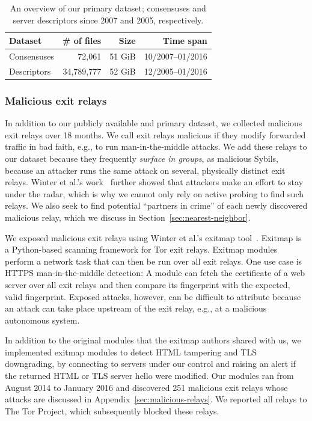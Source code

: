 \begin{table}[t]
\small
\centering
\begin{tabular}{l r r r}
\toprule
\textbf{Dataset} & \textbf{\# of files} & \textbf{Size} & \textbf{Time span} \\
\midrule
Consensuses & 72,061 & 51 GiB & 10/2007--01/2016 \\
Descriptors & 34,789,777 & 52 GiB & 12/2005--01/2016 \\
\bottomrule
\end{tabular}
\caption{An overview of our primary dataset; consensuses and server descriptors
since 2007 and 2005, respectively.}
\label{tab:collector-dataset}
\end{table}

\subsubsection{Malicious exit relays}
In addition to our publicly available and primary dataset, we collected
malicious exit relays over 18 months.  We call exit relays malicious if they
modify forwarded traffic in bad faith, e.g., to run man-in-the-middle attacks.
We add these relays to our dataset because they frequently \emph{surface in
groups}, as malicious Sybils, because an attacker runs the same attack on
several, physically distinct exit relays.  Winter et al.'s work~\cite[\S
5.2]{Winter2014a} further showed that attackers make an effort to stay under the
radar, which is why we cannot only rely on active probing to find such relays.
We also seek to find potential ``partners in crime'' of each newly discovered
malicious relay, which we discuss in Section~\ref{sec:nearest-neighbor}.

We exposed malicious exit relays using Winter et al.'s exitmap
tool~\cite{Winter2014a}.  Exitmap is a Python-based scanning framework for Tor
exit relays.  Exitmap modules perform a network task that can then be run over
all exit relays.  One use case is HTTPS man-in-the-middle detection: A module
can fetch the certificate of a web server over all exit relays and then compare
its fingerprint with the expected, valid fingerprint.  Exposed attacks, however,
can be difficult to attribute because an attack can take place upstream of the
exit relay, e.g., at a malicious autonomous system.

In addition to the original modules that the exitmap authors shared with us, we
implemented exitmap modules to detect HTML tampering and TLS downgrading, by
connecting to servers under our control and raising an alert if the returned
HTML or TLS server hello were modified.  Our modules ran from August 2014 to
January 2016 and discovered 251 malicious exit relays whose attacks are
discussed in Appendix~\ref{sec:malicious-relays}.  We reported all relays to The
Tor Project, which subsequently blocked these relays.

